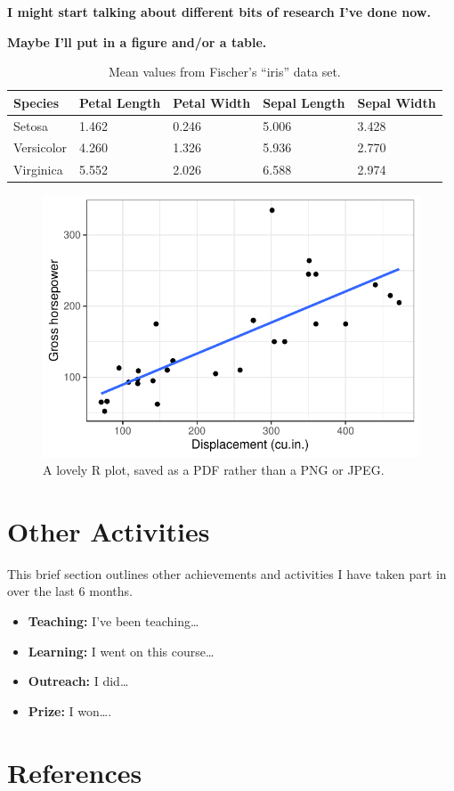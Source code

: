 \documentclass[12pt]{article}
\begin{document}
\textbf{I might start talking about different bits of research I've done now.} \lipsum[5]

\textbf{Maybe I'll put in a figure and/or a table.}

\begin{table}[bht]
    \centering
    \begin{tabularx}{\linewidth}{lXXXX}
        \toprule
        \textbf{Species} & \textbf{Petal Length} & \textbf{Petal Width} & \textbf{Sepal Length} & \textbf{Sepal Width} \\ 
        \midrule
        Setosa & 1.462 & 0.246 & 5.006 & 3.428 \\ 
        Versicolor & 4.260 & 1.326 & 5.936 & 2.770 \\ 
        Virginica & 5.552 & 2.026 & 6.588 & 2.974 \\ 
        \bottomrule
    \end{tabularx}
    \caption{Mean values from Fischer's ``iris'' data set.}
    \label{tab:wide_tab}
\end{table}

\begin{figure}[bht]
    \centering
    \includegraphics[width=.7\linewidth]{myplot.pdf}
    \caption{A lovely R plot, saved as a PDF rather than a PNG or JPEG.}
    \label{fig:mtcars}
\end{figure}

\newpage\section{Other Activities}\label{sec:other}

This brief section outlines other achievements and activities I have taken part in over the last 6 months.

\begin{itemize}
    \item \textbf{Teaching:} I've been teaching\dots
    \item \textbf{Learning:} I went on this course\dots
    \item \textbf{Outreach:} I did\dots
    \item \textbf{Prize:} I won\dots.
\end{itemize}

\newpage\section{References}
{\RaggedRight\sloppy
\printbibliography[heading = none]}
\end{document}
